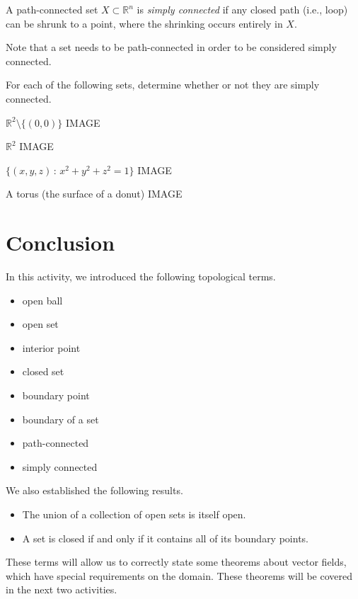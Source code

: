 \documentclass{ximera}
\begin{document}
\begin{definition}
A path-connected set $X\subset\mathbb{R}^n$ is \emph{simply connected} if any closed path (i.e., loop) can be shrunk to a point, where the shrinking occurs entirely in $X$.
\end{definition}

Note that a set needs to be path-connected in order to be considered simply connected.

\begin{example}
\begin{foldable}
For each of the following sets, determine whether or not they are simply connected.

$\mathbb{R}^2\setminus\{(0,0)\}$
IMAGE
\begin{multipleChoice}
\end{multipleChoice}

$\mathbb{R}^2$
IMAGE
\begin{multipleChoice}
\end{multipleChoice}

$\{(x,y,z)\,:\,x^2+y^2+z^2=1\}$
IMAGE
\begin{multipleChoice}
\end{multipleChoice}

A torus (the surface of a donut)
IMAGE
\begin{multipleChoice}
\end{multipleChoice}
\end{foldable}
\end{example}

\section{Conclusion}

In this activity, we introduced the following topological terms.
\begin{itemize}
\item open ball
\item open set
\item interior point
\item closed set
\item boundary point
\item boundary of a set
\item path-connected
\item simply connected
\end{itemize}

We also established the following results.
\begin{itemize}
\item The union of a collection of open sets is itself open.
\item A set is closed if and only if it contains all of its boundary points.
\end{itemize}

These terms will allow us to correctly state some theorems about vector fields, which have special requirements on the domain. These theorems will be covered in the next two activities.
\end{document}
